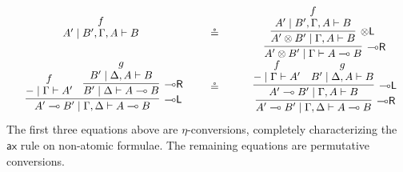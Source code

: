 \documentclass[sn-mathphys-num]{sn-jnl}%
\newcommand{\GG}{\Gamma}
\newcommand{\GD}{\Delta}
\newcommand{\vd}{\vdash}
\newcommand{\tl}{\otimes \mathsf{L}}
\newcommand{\tr}{\otimes\mathsf{R}}
\newcommand{\pass}{\mathsf{pass}}
\newcommand{\unitl}{\mathsf{IL}}
\newcommand{\unitr}{\mathsf{IR}}
\newcommand{\ax}{\mathsf{ax}}
\newcommand{\ot}{\otimes}
\newcommand{\lolli}{\multimap}
\newcommand{\lleft}{{\lolli}\mathsf{L}}
\newcommand{\lright}{{\lolli}\mathsf{R}}
\newcommand{\unit}{\mathsf{I}}
\newcommand{\proofbox}[1]{\begin{tabular}{l} #1 \end{tabular}}
\theoremstyle{thmstyleone}%
\theoremstyle{thmstyletwo}%
\theoremstyle{thmstylethree}%
\begin{document}
\begin{displaymath}
\begin{array}{ccc}
{{{        \deduce{A' \mid B' , \GG , A \vd B}{f}
      }
    }
  }
  \quad
  &\circeq&
  \quad
  \proofbox{
    \infer[\lright]{A' \ot B' \mid \GG \vd A \lolli B}{
      \infer[\tl]{A' \ot B' \mid \GG , A \vd B}{
        \deduce{A' \mid B' , \GG , A \vd B}{f}
      }
    }
  }
  \\[15pt]
  \proofbox{
    \infer[\lleft]{A' \lolli B' \mid \GG , \GD \vd A \lolli B}{
      \deduce{{-} \mid \GG \vd A'}{f}
      &
      \infer[\lright]{B' \mid \GD \vd A \lolli B}{
        \deduce{B' \mid \GD , A \vd B}{g}
      }
    }
  }
  \quad
  &\circeq&
  \quad
  \proofbox{
    \infer[\lright]{A' \lolli B' \mid \GG , \GD \vd A \lolli B}{
      \infer[\lleft]{A' \lolli B' \mid \GG , A \vd B}{
        \deduce{{-} \mid \GG \vd A'}{f}
        &
        \deduce{B' \mid \GD , A \vd B}{g}
      }
    }
  }
\end{array}
\end{displaymath}
The first three equations above are $\eta$-conversions, completely characterizing the $\ax$ rule on non-atomic formulae. The remaining equations are permutative conversions.
\end{document}
